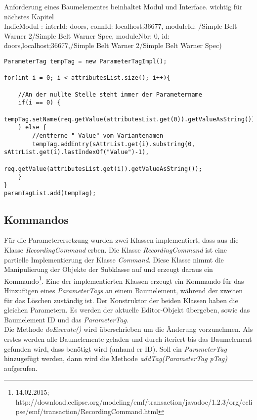 Anforderung eines Baumelementes beinhaltet Modul und Interface. wichtig für nächstes Kapitel\\

IndieModul : interId: doors, connId: localhost;36677, moduleId: /Simple Belt Warner 2/Simple Belt Warner Spec, moduleNbr: 0, id: doors,localhost;36677,/Simple Belt Warner 2/Simple Belt Warner Spec)\\


\begin{lstlisting}[caption={Erstellung der ParameterTag}, captionpos=b,label={lst:CreateParamTag}]
ParameterTag tempTag = new ParameterTagImpl();
		
for(int i = 0; i < attributesList.size(); i++){
	
	//An der nullte Stelle steht immer der Parametername
	if(i == 0) {
		tempTag.setName(req.getValue(attributesList.get(0)).getValueAsString());
	} else {
		//entferne " Value" vom Variantenamen 
		tempTag.addEntry(sAttrList.get(i).substring(0, sAttrList.get(i).lastIndexOf("Value")-1),
				req.getValue(attributesList.get(i)).getValueAsString());
	}
}
paramTagList.add(tempTag);
\end{lstlisting}


\subsection{Kommandos}\label{sub.Command}
Für die Parameterersetzung wurden zwei Klassen implementiert, dass aus die Klasse \textit{RecordingCommand} erben. Die Klasse \textit{RecordingCommand} ist eine partielle Implementierung der Klasse \textit{Command}. Diese Klasse nimmt die  Manipulierung der Objekte der Subklasse auf und erzeugt daraus ein Kommando\footnote{14.02.2015; http://download.eclipse.org/modeling/emf/transaction/javadoc/1.2.3/org/eclipse/emf/transaction/RecordingCommand.html}. Eine der implementierten Klassen erzeugt ein Kommando für das Hinzufügen eines \textit{ParameterTags} an einem Baumelement, während der zweiten für das Löschen zuständig ist. Der Konstruktor der beiden Klassen haben die gleichen Parametern. Es werden der aktuelle Editor-Objekt übergeben, sowie das Baumelement ID und das \textit{ParameterTag}.\\


Die Methode \textit{doExecute()} wird überschrieben um die Änderung vorzunehmen. Als erstes werden alle Baumelemente geladen und durch iteriert bis das Baumelement gefunden wird, dass benötigt wird (anhand er ID). Soll ein \textit{ParameterTag} hinzugefügt werden, dann wird die Methode \textit{addTag(ParameterTag pTag)} aufgerufen.\\


